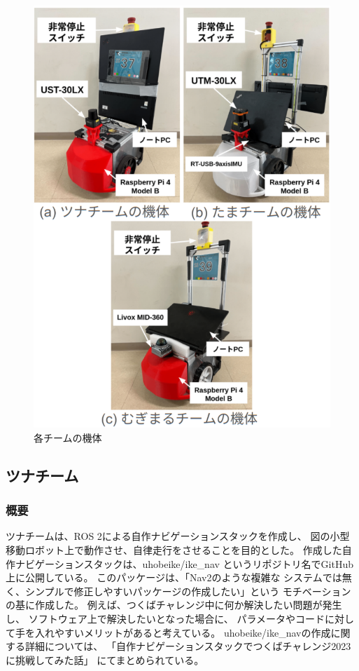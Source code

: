\documentclass[twocolumn,9pt]{jsproceedings}
\begin{document}
\begin{figure}[h]
  \begin{center}
    \includegraphics[width=1.0\linewidth]{figs/robot.pdf}
    \caption{各チームの機体}
    \label{fig:robot}
  \end{center}
\end{figure}
\subsection{ツナチーム}

\subsubsection{概要}
ツナチームは、ROS 2による自作ナビゲーションスタックを作成し、
図の小型移動ロボット上で動作させ、自律走行をさせることを目的とした。
作成した自作ナビゲーションスタックは、uhobeike/ike\_nav\cite{ike_nav}
というリポジトリ名でGitHub上に公開している。
このパッケージは、「Nav2のような複雑な
システムでは無く、シンプルで修正しやすいパッケージの作成したい」という
モチベーションの基に作成した。
例えば、つくばチャレンジ中に何か解決したい問題が発生し、
ソフトウェア上で解決したいとなった場合に、
パラメータやコードに対して手を入れやすいメリットがあると考えている。
uhobeike/ike\_navの作成に関する詳細については、
「自作ナビゲーションスタックでつくばチャレンジ2023に挑戦してみた話」
\cite{ike_nav_detail}にてまとめられている。
\end{document}
